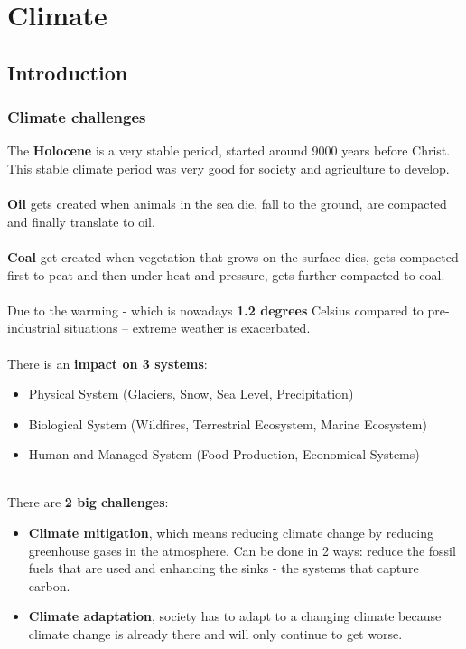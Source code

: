 \documentclass[../summary.tex]{subfiles}
\begin{document}
	
\section{Climate}
\subsection{Introduction}
\subsubsection{Climate challenges}

The \textbf{Holocene} is a very stable period, started around 9000 years before Christ. This stable climate period was very good for society and agriculture to develop.\\
\\
\textbf{Oil} gets created when animals in the sea die, fall to the ground, are compacted and finally translate to oil.\\
\\
\textbf{Coal} get created when vegetation that grows on the surface dies, gets compacted first to peat and then under heat and pressure, gets further compacted to coal.\\
\\
Due to the warming - which is nowadays \textbf{1.2 degrees} Celsius compared to pre-industrial situations – extreme weather is exacerbated.\\
\\
There is an \textbf{impact on 3 systems}:
\begin{itemize}
	\setlength\itemsep{0.1em}
	\item Physical System (Glaciers, Snow, Sea Level, Precipitation)
	\item Biological System (Wildfires, Terrestrial Ecosystem, Marine Ecosystem)
	\item Human and Managed System (Food Production, Economical Systems)
\end{itemize}
\ \\
There are \textbf{2 big challenges}:
\begin{itemize}
	\item \textbf{Climate mitigation}, which means reducing climate change by reducing greenhouse gases in the atmosphere. Can be done in 2 ways: reduce the fossil fuels that are used and enhancing the sinks - the systems that capture carbon.
	\item \textbf{Climate adaptation}, society has to adapt to a changing climate because climate change is already there and will only continue to get worse.
\end{itemize}
\ \\
\end{document}
